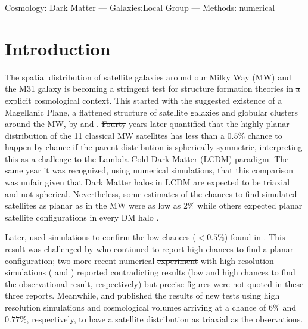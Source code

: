 \documentclass[a4paper,fleqn,usenatbib]{mnras}
\providecommand{\DIFaddtex}[1]{{\protect\color{blue}\uwave{#1}}} %
\providecommand{\DIFdeltex}[1]{{\protect\color{red}\sout{#1}}}                      %
\providecommand{\DIFaddbegin}{} %
\providecommand{\DIFaddend}{} %
\providecommand{\DIFdelbegin}{} %
\providecommand{\DIFdelend}{} %
\providecommand{\DIFadd}[1]{\texorpdfstring{\DIFaddtex{#1}}{#1}} %
\providecommand{\DIFdel}[1]{\texorpdfstring{\DIFdeltex{#1}}{}} %
\newcommand{\DIFscaledelfig}{0.5}
\newlength{\DIFdelgraphicswidth} %
\newlength{\DIFdelgraphicsheight} %
\newcommand{\DIFaddincludegraphics}[2][]{{\color{blue}\fbox{\DIFOincludegraphics[#1]{#2}}}} %
\newcommand{\DIFdelincludegraphics}[2][]{%
\sbox{\DIFdelgraphicsbox}{\DIFOincludegraphics[#1]{#2}}%
\settoboxwidth{\DIFdelgraphicswidth}{\DIFdelgraphicsbox} %
\settoboxtotalheight{\DIFdelgraphicsheight}{\DIFdelgraphicsbox} %
\scalebox{\DIFscaledelfig}{%
\parbox[b]{\DIFdelgraphicswidth}{\usebox{\DIFdelgraphicsbox}\\[-\baselineskip] \rule{\DIFdelgraphicswidth}{0em}}\llap{\resizebox{\DIFdelgraphicswidth}{\DIFdelgraphicsheight}{%
\setlength{\unitlength}{\DIFdelgraphicswidth}%
\begin{picture}(1,1)%
\thicklines\linethickness{2pt} %
{\color[rgb]{1,0,0}\put(0,0){\framebox(1,1){}}}%
{\color[rgb]{1,0,0}\put(0,0){\line( 1,1){1}}}%
{\color[rgb]{1,0,0}\put(0,1){\line(1,-1){1}}}%
\end{picture}%
}\hspace*{3pt}}} %
} %
\DeclareRobustCommand{\DIFaddbegin}{\DIFOaddbegin \let\includegraphics\DIFaddincludegraphics} %
\DeclareRobustCommand{\DIFaddend}{\DIFOaddend \let\includegraphics\DIFOincludegraphics} %
\DeclareRobustCommand{\DIFdelbegin}{\DIFOdelbegin \let\includegraphics\DIFdelincludegraphics} %
\DeclareRobustCommand{\DIFdelend}{\DIFOaddend \let\includegraphics\DIFOincludegraphics} %
\begin{document}
\begin{keywords}Cosmology: Dark Matter --- Galaxies:Local Group ---
  Methods: numerical  
\end{keywords}

\section{Introduction}

The spatial distribution of satellite galaxies around our Milky Way
(MW) and the M31 galaxy is becoming a stringent test for structure
formation theories in \DIFdelbegin \DIFdel{a }\DIFdelend \DIFaddbegin \DIFadd{an }\DIFaddend explicit cosmological context. 
This started with the suggested existence of a Magellanic Plane, a flattened
structure of satellite galaxies and globular clusters around the MW,
by \cite{1976RGOB..182..241K} and \cite{1976MNRAS.174..695L}.  
\DIFdelbegin \DIFdel{Fourty }\DIFdelend \DIFaddbegin \DIFadd{Forty }\DIFaddend years later \cite{2005A&A...431..517K} quantified that the
highly planar distribution of the 11 classical MW satellites has less
than a $0.5\%$ chance to happen by chance if the
parent distribution is spherically symmetric, interpreting this as a
challenge to the Lambda Cold Dark Matter (LCDM) paradigm.
The same year it was recognized, using numerical simulations, that
this comparison was unfair given that Dark Matter halos in LCDM
are expected to be triaxial and not spherical.
Nevertheless, some estimates of the chances to find simulated satellites as
planar as in the MW 
were as low as $2\%$ \citep{2005ApJ...629..219Z} while others expected
planar satellite configurations in every DM halo
\citep{2005MNRAS.363..146L}.

Later, \cite{2007MNRAS.374.1125M} used simulations to confirm the low
chances ($<0.5\%$) found in \cite{2005A&A...431..517K}.
This result was challenged by \cite{2009MNRAS.399..550L} who continued
to report high chances to find a planar configuration;
two more recent numerical \DIFdelbegin \DIFdel{experiment }\DIFdelend \DIFaddbegin \DIFadd{experiments }\DIFaddend with high resolution simulations
(\cite{2013MNRAS.429..725S} and \cite{2016MNRAS.457.1931S}) reported
contradicting results (low and high chances to find the observational
result, respectively) but precise figures were not quoted in these three reports. 
Meanwhile, \cite{2013MNRAS.429.1502W} and \cite{2014ApJ...789L..24P} published
the results of new tests using high resolution simulations and cosmological
volumes arriving at a chance of $6\%$ and $0.77\%$, respectively, to
have a satellite distribution as triaxial as the observations. 
\end{document}

